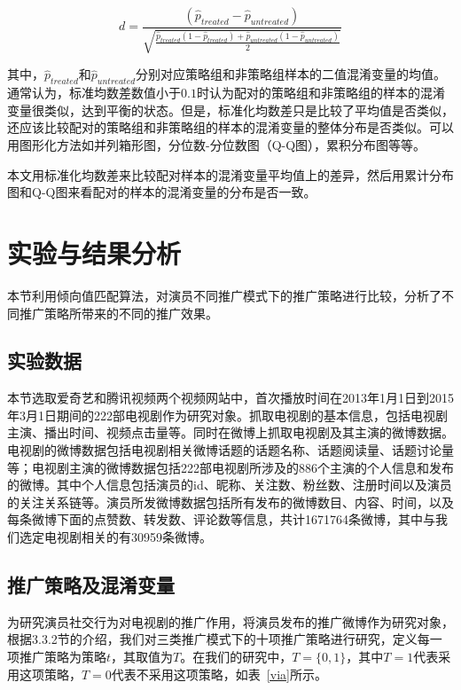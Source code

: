 \begin{equation}d = \frac{(\hat{p}_{treated} - \hat{p}_{untreated})}{\sqrt{\frac{\hat{p}_{treated}(1 - \hat{p}_{treated}) + \hat{p}_{untreated}(1 - \hat{p}_{untreated})}{2}}}\end{equation}

其中，$\hat{p}_{treated}$和$\hat{p}_{untreated}$分别对应策略组和非策略组样本的二值混淆变量的均值。通常认为，标准均数差数值小于$0.1$时认为配对的策略组和非策略组的样本的混淆变量很类似，达到平衡的状态\cite{normand2001validating}。但是，标准化均数差只是比较了平均值是否类似，还应该比较配对的策略组和非策略组的样本的混淆变量的整体分布是否类似。可以用图形化方法如并列箱形图，分位数-分位数图（Q-Q图），累积分布图等等。

本文用标准化均数差来比较配对样本的混淆变量平均值上的差异，然后用累计分布图和Q-Q图来看配对的样本的混淆变量的分布是否一致。

\section{实验与结果分析}

本节利用倾向值匹配算法，对演员不同推广模式下的推广策略进行比较，分析了不同推广策略所带来的不同的推广效果。

\subsection{实验数据}

本节选取爱奇艺和腾讯视频两个视频网站中，首次播放时间在2013年1月1日到2015年3月1日期间的222部电视剧作为研究对象。抓取电视剧的基本信息，包括电视剧主演、播出时间、视频点击量等。同时在微博上抓取电视剧及其主演的微博数据。电视剧的微博数据包括电视剧相关微博话题的话题名称、话题阅读量、话题讨论量等；电视剧主演的微博数据包括222部电视剧所涉及的886个主演的个人信息和发布的微博。其中个人信息包括演员的id、昵称、关注数、粉丝数、注册时间以及演员的关注关系链等。演员所发微博数据包括所有发布的微博数目、内容、时间，以及每条微博下面的点赞数、转发数、评论数等信息，共计1671764条微博，其中与我们选定电视剧相关的有30959条微博。

\subsection{推广策略及混淆变量}

为研究演员社交行为对电视剧的推广作用，将演员发布的推广微博作为研究对象，根据3.3.2节的介绍，我们对三类推广模式下的十项推广策略进行研究，定义每一项推广策略为策略$t$，其取值为$T$。在我们的研究中，$T = \{0, 1\}$，其中$T = 1$代表采用这项策略，$T = 0$代表不采用这项策略，如表~\ref{via}所示。

